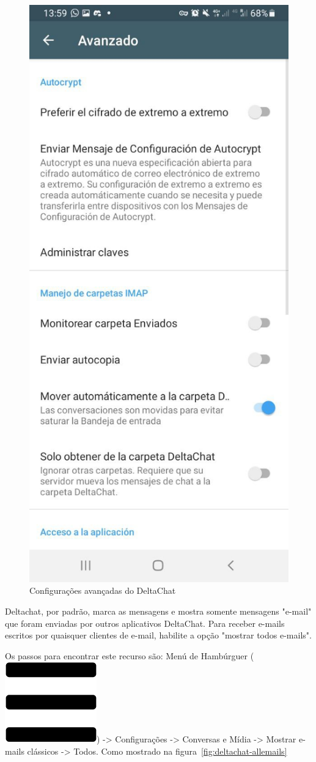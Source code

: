 \documentclass[11pt,a4paper]{article}
\begin{document}
\begin{figure}[H]
    \centering
    \includegraphics[width=0.3\columnwidth]{screenshots/deltachat/es/adv_p2pe_es.jpeg}
    	\caption{Configurações avançadas do DeltaChat}
	\vspace{-10pt}
    \label{fig:deltachat-adv_p2pe}
\end{figure}

Deltachat, por padrão, marca as mensagens e mostra somente mensagens "e-mail" que foram enviadas por outros aplicativos DeltaChat. Para receber e-mails escritos por quaisquer clientes de e-mail, habilite a opção "mostrar todos e-mails".


Os passos para encontrar este recurso são: Menú de Hambúrguer (\includegraphics[height=0.78\baselineskip]{pictures/burger.png}) -> Configurações -> Conversas e Mídia -> Mostrar e-mails clássicos -> Todos. Como mostrado na figura~\ref{fig:deltachat-allemails} 

\end{document}
